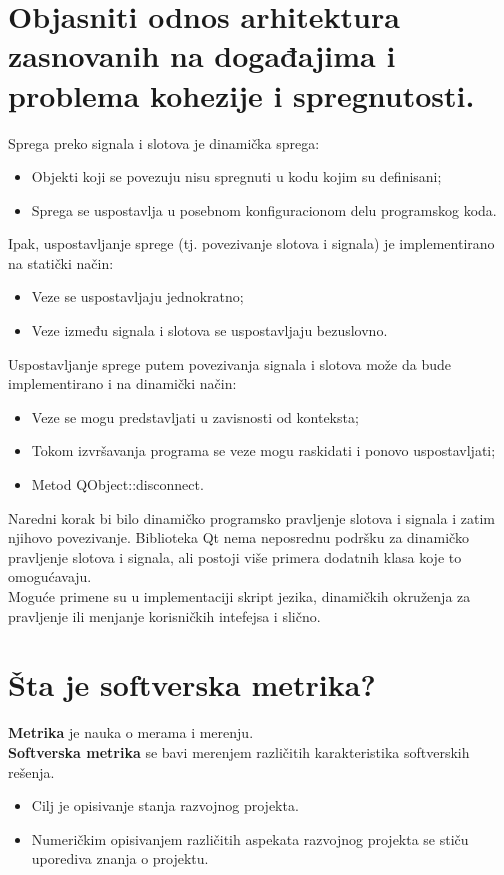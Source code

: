 \documentclass[a4paper]{article}
\begin{document}
\section{Objasniti odnos arhitektura zasnovanih na događajima i problema kohezije i spregnutosti.}
  \noindent Sprega preko signala i slotova je dinamička sprega:
  \begin{itemize}
    \item Objekti koji se povezuju nisu spregnuti u kodu kojim su definisani;
    \item Sprega se uspostavlja u posebnom konfiguracionom delu programskog koda.
  \end{itemize}
  Ipak, uspostavljanje sprege (tj. povezivanje slotova i signala) je implementirano na statički način:
  \begin{itemize}
    \item Veze se uspostavljaju jednokratno;
    \item Veze između signala i slotova se uspostavljaju bezuslovno.
  \end{itemize}
  Uspostavljanje sprege putem povezivanja signala i slotova može da bude implementirano 
  i na dinamički način:
  \begin{itemize}
    \item Veze se mogu predstavljati u zavisnosti od konteksta;
    \item Tokom izvršavanja programa se veze mogu raskidati i ponovo uspostavljati;
    \item Metod QObject::disconnect.
  \end{itemize}
  
  Naredni korak bi bilo dinamičko programsko pravljenje slotova i signala 
  i zatim njihovo povezivanje. Biblioteka Qt nema neposrednu podršku za dinamičko 
  pravljenje slotova i signala, ali postoji više primera dodatnih klasa koje to omogućavaju.\\
  \indent Moguće primene su u implementaciji skript jezika, dinamičkih okruženja za pravljenje ili 
  menjanje korisničkih intefejsa i slično.


\section{Šta je softverska metrika?}
  \textbf{Metrika} je nauka o merama i merenju.\\

  \textbf{Softverska metrika} se bavi merenjem različitih karakteristika softverskih rešenja. \\
  \begin{itemize}
    \item Cilj je opisivanje stanja razvojnog projekta. 
    \item Numeričkim opisivanjem različitih aspekata razvojnog 
          projekta se stiču uporediva znanja o projektu.
  \end{itemize}
\end{document}
